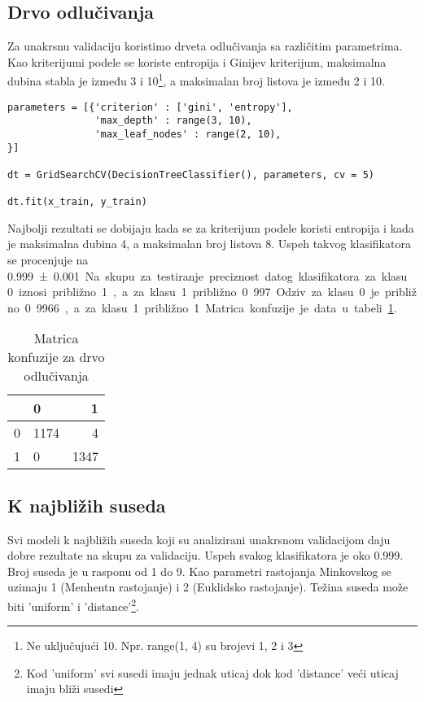 \documentclass[a4paper]{article}
\begin{document}
\subsection{Drvo odlučivanja}
Za unakrsnu validaciju koristimo drveta odlučivanja sa različitim parametrima. Kao kriterijumi podele se koriste entropija i Ginijev kriterijum, maksimalna dubina stabla je između 3 i 10\footnote{Ne uključujući 10. Npr. range(1, 4) su brojevi 1, 2 i 3}, a maksimalan broj listova je između 2 i 10. 

\begin{lstlisting}[caption={Pravljenje drveta odlučivanja},frame=single, label=simple]
parameters = [{'criterion' : ['gini', 'entropy'],
               'max_depth' : range(3, 10),
               'max_leaf_nodes' : range(2, 10),
}]

dt = GridSearchCV(DecisionTreeClassifier(), parameters, cv = 5)

dt.fit(x_train, y_train)
\end{lstlisting}

Najbolji rezultati se dobijaju kada se za kriterijum podele koristi entropija i kada je maksimalna dubina 4, a maksimalan broj listova 8. Uspeh takvog klasifikatora se procenjuje na \SI{0.999 \pm 0.001}. Na skupu za testiranje preciznost datog klasifikatora za klasu 0 iznosi približno 1, a za klasu 1 približno 0.997. Odziv za klasu 0 je približno 0.9966, a za klasu 1 približno 1. Matrica konfuzije je data u tabeli \ref{tab:matKonfDecisionTree}. 
\begin{table}[h!]
\begin{center}
\caption{Matrica konfuzije za drvo odlučivanja}
\begin{tabular}{|c|l|r|} \hline
& 0& 1\\ \hline
0 &1174&4\\ \hline
1 &0&1347\\ \hline
\end{tabular}
\label{tab:matKonfDecisionTree}
\end{center}
\end{table}




\subsection{K najbližih suseda}
Svi modeli k najbližih suseda koji su analizirani unakrsnom validacijom daju dobre rezultate na skupu za validaciju. Uspeh svakog klasifikatora je oko 0.999. Broj suseda je u rasponu od 1 do 9. Kao parametri rastojanja Minkovskog se uzimaju 1 (Menhentn rastojanje) i 2 (Euklidsko rastojanje). Težina suseda može biti 'uniform' i 'distance'\footnote{Kod 'uniform' svi susedi imaju jednak uticaj dok kod 'distance' veći uticaj imaju bliži susedi}.
\end{document}
